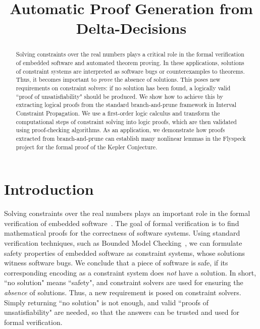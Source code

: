 \documentclass[12pt]{article}
\title{Automatic Proof Generation from Delta-Decisions}
\begin{document}
\maketitle
\begin{abstract}
Solving constraints over the real numbers plays a critical role in the formal verification of embedded software and automated theorem proving. In these applications, solutions of constraint systems are interpreted as software bugs or counterexamples to theorems. Thus, it becomes important to {\em prove} the absence of solutions. This poses new requirements on constraint solvers: if no solution has been found, a logically valid ``proof of unsatisfiability" should be produced. We show how to achieve this by extracting logical proofs from the standard branch-and-prune framework in Interval Constraint Propagation. We use a first-order logic calculus and transform the computational steps of constraint solving into logic proofs, which are then validated using proof-checking algorithms. As an application, we demonstrate how proofs extracted from branch-and-prune can establish many nonlinear lemmas in the Flyspeck project for the formal proof of the Kepler Conjecture.
\end{abstract}

\section{Introduction}

Solving constraints over the real numbers plays an important role in the formal verification of embedded software~\cite{DBLP:conf/cade/GaoAC12}. The goal of formal verification is to find mathematical proofs for the correctness of software systems. Using standard verification techniques, such as Bounded Model Checking~\cite{DBLP:journals/fmsd/ClarkeBRZ01}, we can formulate safety properties of embedded software as constraint systems, whose solutions witness software bugs. We conclude that a piece of software is safe, if its corresponding encoding as a constraint system does {\em not} have a solution. In short, ``no solution" means ``safety", and constraint solvers are used for ensuring the {\em absence} of solutions. Thus, a new requirement is posed on constraint solvers. Simply returning ``no solution" is not enough, and valid ``proofs of unsatisfiability" are needed, so that the answers can be trusted and used for formal verification.
\end{document}
